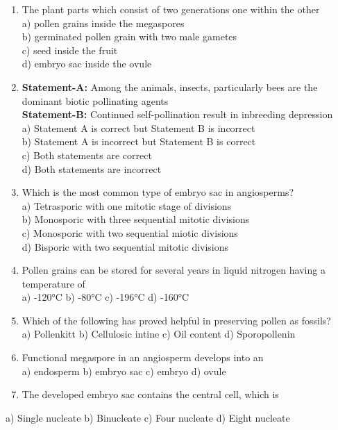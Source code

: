 \begin{enumerate}
\def\labelenumi{\arabic{enumi}.}
\setcounter{enumi}{151}
\item
  The plant parts which consist of two generations one within the
  other\\
  a) pollen grains inside the megaspores\\
  b) germinated pollen grain with two male gametes\\
  c) seed inside the fruit\\
  d) embryo sac inside the ovule
\item
  \textbf{Statement-A:} Among the animals, insects, particularly bees
  are the dominant biotic pollinating agents\\
  \textbf{Statement-B:} Continued self-pollination result in inbreeding
  depression\\
  a) Statement A is correct but Statement B is incorrect\\
  b) Statement A is incorrect but Statement B is correct\\
  c) Both statements are correct\\
  d) Both statements are incorrect
\item
  Which is the most common type of embryo sac in angiosperms?\\
  a) Tetrasporic with one mitotic stage of divisions\\
  b) Monosporic with three sequential mitotic divisions\\
  c) Monosporic with two sequential miotic divisions\\
  d) Bisporic with two sequential mitotic divisions
\item
  Pollen grains can be stored for several years in liquid nitrogen
  having a temperature of\\
  a) -120°C b) -80°C c) -196°C d) -160°C
\item
  Which of the following has proved helpful in preserving pollen as
  fossils?\\
  a) Pollenkitt b) Cellulosic intine c) Oil content d) Sporopollenin
\item
  Functional megaspore in an angiosperm develops into an\\
  a) endosperm b) embryo sac c) embryo d) ovule
\item
  The developed embryo sac contains the central cell, which is
\end{enumerate}

a) Single nucleate b) Binucleate c) Four nucleate d) Eight nucleate

